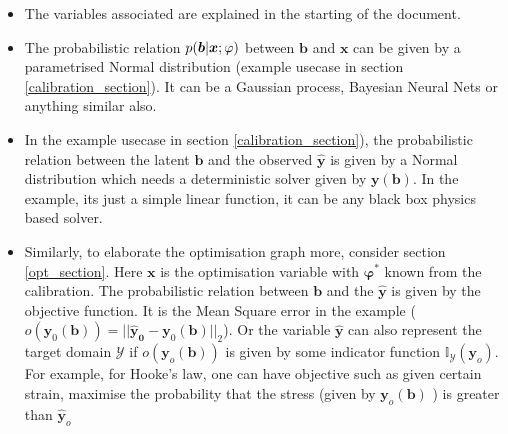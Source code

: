 \documentclass[a4paper,11pt]{article}
\begin{document}
\begin{itemize}
    \item The variables associated are explained in the starting of the document. 
    \item The probabilistic relation $p(\boldsymbol{b} | \boldsymbol{x}; \varphi)$ between $\bm b$ and $\bm x$ can be given by a parametrised Normal distribution (example usecase in section \ref{calibration_section}). It can be a Gaussian process, Bayesian Neural Nets or anything similar also.
    \item In the example usecase in section \ref{calibration_section}), the probabilistic relation between the latent $\bm b $ and the observed $\bm \hat{y}$ is given by a Normal distribution which needs a deterministic solver given by $\bm y(\bm b)$. In the example, its just a simple linear function, it can be any black box physics based solver.
    \item Similarly, to elaborate the optimisation graph more, consider section \ref{opt_section}. Here $\bm x$ is the optimisation variable with $\bm \varphi^*$ known from the calibration. The probabilistic relation between  $\bm b $ and the $\bm \hat{\bm y}$ is given by the objective function. It is the Mean Square error in the example ($o(\bm{y}_0(\bm{b})) = || \bm{\hat{y}_0} - \bm{y}_0(\bm{b}) ||_2$). Or the variable $\bm \hat{y}$ can also represent the target domain $\mathcal{Y}$ if $o(\bm y_o(\bm b))$ is given by some indicator function $\mathbb{I}_{\mathcal{Y}}(\bm y_o)$. For example, for Hooke's law, one can have objective such as given certain strain, maximise the probability that the stress (given by $\bm y_o(\bm b)$ ) is greater than $\hat{\bm y}_o$ 
    
\end{itemize}
\end{document}
